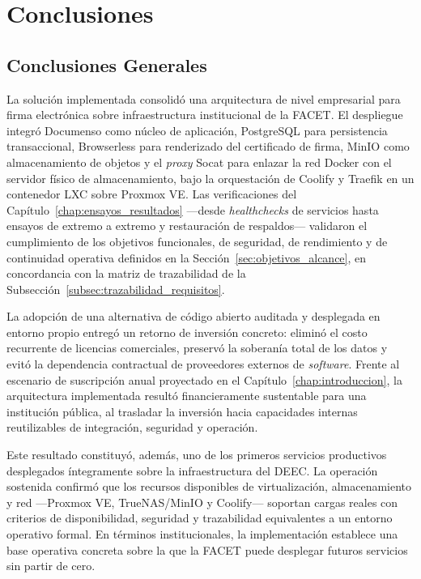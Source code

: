 \chapter{Conclusiones}
\label{chap:conclusiones}


\section{Conclusiones Generales}
\label{sec:conclusiones_generales}

La solución implementada consolidó una arquitectura de nivel empresarial para firma electrónica sobre infraestructura institucional de la FACET. El despliegue integró Documenso como núcleo de aplicación, PostgreSQL para persistencia transaccional, Browserless para renderizado del certificado de firma, MinIO como almacenamiento de objetos y el \textit{proxy} Socat para enlazar la red Docker con el servidor físico de almacenamiento, bajo la orquestación de Coolify y Traefik en un contenedor LXC sobre Proxmox VE. Las verificaciones del Capítulo~\ref{chap:ensayos_resultados} ---desde \textit{healthchecks} de servicios hasta ensayos de extremo a extremo y restauración de respaldos--- validaron el cumplimiento de los objetivos funcionales, de seguridad, de rendimiento y de continuidad operativa definidos en la Sección~\ref{sec:objetivos_alcance}, en concordancia con la matriz de trazabilidad de la Subsección~\ref{subsec:trazabilidad_requisitos}.

La adopción de una alternativa de código abierto auditada y desplegada en entorno propio entregó un retorno de inversión concreto: eliminó el costo recurrente de licencias comerciales, preservó la soberanía total de los datos y evitó la dependencia contractual de proveedores externos de \textit{software}. Frente al escenario de suscripción anual proyectado en el Capítulo~\ref{chap:introduccion}, la arquitectura implementada resultó financieramente sustentable para una institución pública, al trasladar la inversión hacia capacidades internas reutilizables de integración, seguridad y operación.

Este resultado constituyó, además, uno de los primeros servicios productivos desplegados íntegramente sobre la infraestructura del DEEC. La operación sostenida confirmó que los recursos disponibles de virtualización, almacenamiento y red ---Proxmox VE, TrueNAS/MinIO y Coolify--- soportan cargas reales con criterios de disponibilidad, seguridad y trazabilidad equivalentes a un entorno operativo formal. En términos institucionales, la implementación establece una base operativa concreta sobre la que la FACET puede desplegar futuros servicios sin partir de cero.

